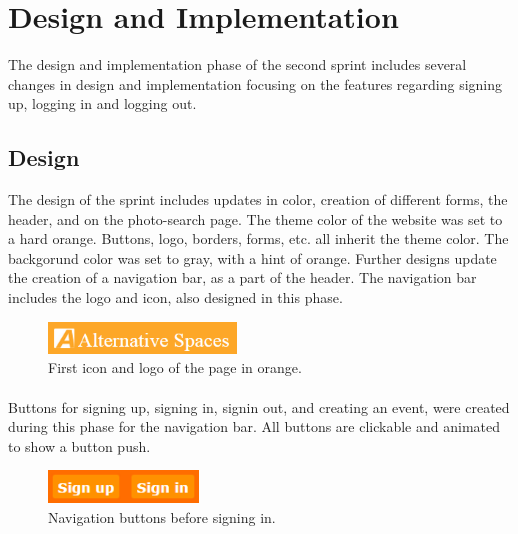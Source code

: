 \section{Design and Implementation} 
\label{sec:S2DesignImpl}
The design and implementation phase of the second sprint includes several changes in design and implementation focusing on the features regarding signing up, logging in and logging out. 

\subsection{Design}
\label{subsec:S2DesignImplDesign}
The design of the sprint includes updates in color, creation of different forms, the header, and on the photo-search page. The theme color of the website was set to a hard orange. Buttons, logo, borders, forms, etc. all inherit the theme color. The backgorund color was set to gray, with a hint of orange. Further designs update the creation of a navigation bar, as a part of the header. The navigation bar includes the logo and icon, also designed in this phase. \\

\begin{figure}[ht!]
\centering
\includegraphics[width=50mm]{Sprint2/img/Sprint2-logo1.png}
\caption{First icon and logo of the page in orange. \label{overflow}}
\end{figure}

\paragraph{} Buttons for signing up, signing in, signin out, and creating an event, were created during this phase for the navigation bar. All buttons are clickable and animated to show a button push. \\

\begin{figure}[ht!]
\centering
\includegraphics[width=40mm]{Sprint2/img/Sprint2-buttons1.png}
\caption{Navigation buttons before signing in. \label{overflow}}
\end{figure}

